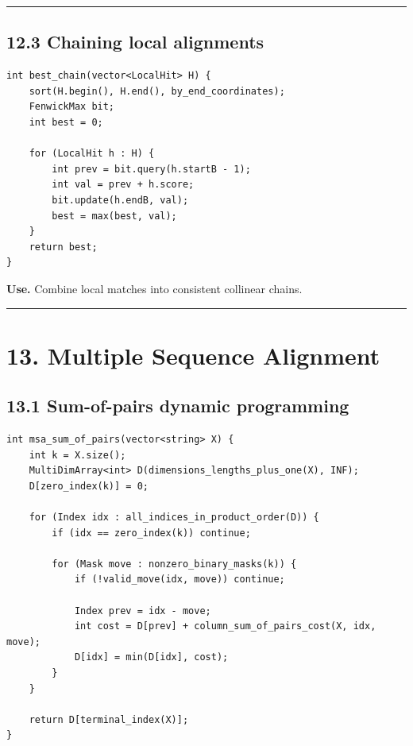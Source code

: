 \documentclass[11pt]{article}
\begin{document}
\begin{center}\rule{0.5\linewidth}{0.5pt}\end{center}

\subsection{12.3 Chaining local alignments}\label{chaining-local-alignments}

\begin{verbatim}
int best_chain(vector<LocalHit> H) {
    sort(H.begin(), H.end(), by_end_coordinates);
    FenwickMax bit;
    int best = 0;

    for (LocalHit h : H) {
        int prev = bit.query(h.startB - 1);
        int val = prev + h.score;
        bit.update(h.endB, val);
        best = max(best, val);
    }
    return best;
}
\end{verbatim}

\textbf{Use.} Combine local matches into consistent collinear chains.

\begin{center}\rule{0.5\linewidth}{0.5pt}\end{center}

\section{13. Multiple Sequence Alignment}\label{multiple-sequence-alignment}

\subsection{13.1 Sum-of-pairs dynamic programming}\label{sum-of-pairs-dynamic-programming}

\begin{verbatim}
int msa_sum_of_pairs(vector<string> X) {
    int k = X.size();
    MultiDimArray<int> D(dimensions_lengths_plus_one(X), INF);
    D[zero_index(k)] = 0;

    for (Index idx : all_indices_in_product_order(D)) {
        if (idx == zero_index(k)) continue;

        for (Mask move : nonzero_binary_masks(k)) {
            if (!valid_move(idx, move)) continue;

            Index prev = idx - move;
            int cost = D[prev] + column_sum_of_pairs_cost(X, idx, move);
            D[idx] = min(D[idx], cost);
        }
    }

    return D[terminal_index(X)];
}
\end{verbatim}
\end{document}
